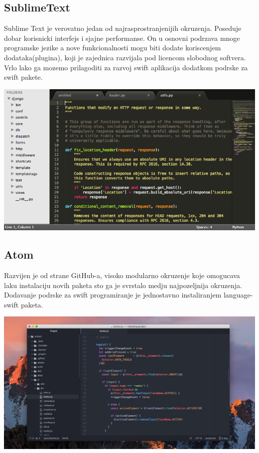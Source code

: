 \documentclass[a4paper]{article}
\begin{document}
\subsection{SublimeText}
\label{subsec:podnaslovSublimeText}

\vspace{3mm}

Sublime Text je verovatno jedan od najrasprostranjenijih okruzenja. Poseduje dobar korisnicki interfejs i sjajne performanse. On u osnovni podrzava mnoge programske jezike a nove funkcionalnosti mogu biti dodate koriscenjem dodataka(plugina), koji je zajednica razvijala pod licencom slobodnog softvera. Vrlo lako ga mozemo prilagoditi za razvoj swift aplikacija dodatkom podrske za swift pakete.
\vspace{3mm}


\includegraphics[scale=0.25]{sublime.png}

\subsection{Atom}
\label{subsec:podnaslovAtom}
Razvijen je od strane GitHub-a, visoko modularno okruzenje koje omogucava laku instalaciju novih paketa sto ga je svrstalo medju najpozeljnija okruzenja. Dodavanje podrske za swift programiranje je jednostavno instaliranjem language-swift paketa.

\vspace{3mm}

\includegraphics[scale=0.2]{atom.jpg}
\vspace{10mm}
\end{document}
